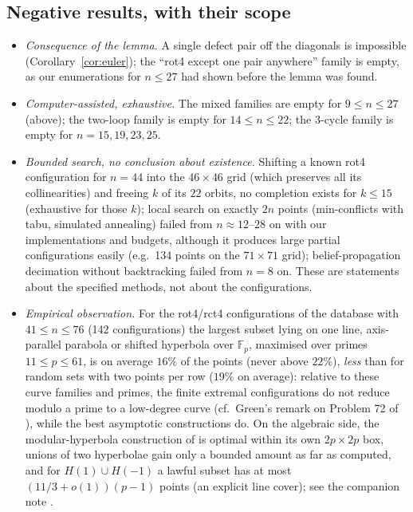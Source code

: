 \documentclass[11pt]{article}
\theoremstyle{remark}
\begin{document}
\subsection{Negative results, with their scope}
\begin{itemize}
\item \emph{Consequence of the lemma.}  A single defect pair off the diagonals is impossible (Corollary~\ref{cor:euler}); the
``rot4 except one pair anywhere'' family is empty, as our enumerations for $n\le 27$ had shown before the lemma was found.
\item \emph{Computer-assisted, exhaustive.}  The mixed families are empty for $9\le n\le27$ (above); the two-loop family is
empty for $14\le n\le22$; the $3$-cycle family is empty for $n=15,19,23,25$.
\item \emph{Bounded search, no conclusion about existence.}  Shifting a known rot4 configuration for $n=44$ into the
$46\times46$ grid (which preserves all its collinearities) and freeing $k$ of its $22$ orbits, no completion exists for
$k\le15$ (exhaustive for those $k$); local search on exactly $2n$ points (min-conflicts with tabu, simulated annealing) failed
from $n\approx12$--$28$ on with our implementations and budgets, although it produces large partial configurations easily
(e.g.\ 134 points on the $71\times71$ grid); belief-propagation decimation without backtracking failed from $n=8$ on.  These
are statements about the specified methods, not about the configurations.
\item \emph{Empirical observation.}  For the rot4/rct4 configurations of the database with $41\le n\le76$ (142
configurations) the largest subset lying on one line, axis-parallel parabola or shifted hyperbola over $\mathbb F_p$,
maximised over primes $11\le p\le61$, is on average $16\%$ of the points (never above $22\%$), \emph{less} than for random
sets with two points per row ($19\%$ on average): relative to these curve families and primes, the finite extremal
configurations do not reduce modulo a prime to a low-degree curve (cf.\ Green's remark on Problem 72 of \cite{Green}), while
the best asymptotic constructions do.  On the algebraic side, the modular-hyperbola construction of \cite{HJSW75} is optimal
within its own $2p\times2p$ box, unions of two hyperbolae gain only a bounded amount as far as computed, and for $H(1)\cup H(-1)$ a lawful
subset has at most $(11/3+o(1))(p-1)$ points (an explicit line cover); see the companion note \cite{Companion}.
\end{itemize}
\end{document}
